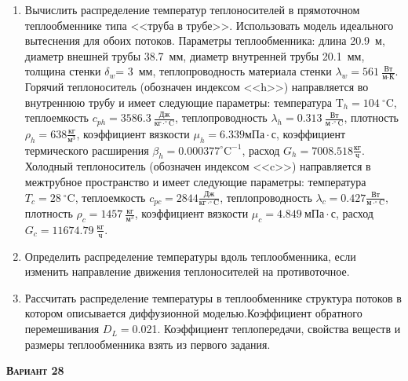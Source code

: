 \begin{enumerate} 
\item Вычислить распределение температур теплоносителей в прямоточном теплообменнике типа <<труба в трубе>>. Использовать модель идеального вытеснения для обоих потоков. Параметры теплообменника: длина  20.9~м, диаметр внешней трубы 38.7~мм,  диаметр внутренней трубы 20.1~мм, толщина стенки $\delta_{w}$=     3~мм,  теплопроводность материала стенки $\lambda_{w}=  561~\frac{\text{Вт}}{\text{м} \cdot \text{К}}$.  Горячий теплоноситель (обозначен индексом <<h>>) направляется во внутреннюю трубу и	 имеет следующие параметры: температура $\text{T}_{h}= 104~^\circ\mathrm{C}$, теплоемкость	  $c_{p{h}}= 3586.3~\frac{\text{Дж}}{\text{кг} \cdot ^\circ\mathrm{C}}$, теплопроводность 		$\lambda_{h}= 0.313~\frac{\text{Вт}}{\text{м} \cdot ^\circ\mathrm{C}}$, плотность 		$\rho_{h}=  638 \frac{\text{кг}}{\text{м}^3}$, коэффициент вязкости $\mu_{h}=6.339 \text{мПа} 		\cdot \text{с} $, коэффициент термического расширения $\beta_{h}=0.000377 ^\circ\mathrm{C}^{-1}$,		 расход $G_{h}= 7008.518 \frac{\text{кг}}{\text{ч}}$. Холодный теплоноситель (обозначен индексом <<c>>) 		 направляется в межтрубное пространство и имеет следующие параметры: температура $T_{c}=   28		 ~^\circ\mathrm{C}$, теплоемкость $c_{p{c}}= 2844 \frac{\text{Дж}}{\text{кг} \cdot ^\circ\mathrm{C}}$,			 теплопроводность $\lambda_{c}=0.427 \frac{\text{Вт}}{\text{м} \cdot ^\circ\mathrm{C}}$, плотность 			 $\rho_{c}=  1457~\frac{\text{кг}}{\text{м}^3}$, коэффициент вязкости $\mu_{c}=4.849~\text{мПа} \cdot \text{с} $, 			 расход $G_{c}=11674.79~\frac{\text{кг}}{\text{ч}}$. 

\item Определить распределение температуры вдоль теплообменника, если 	изменить направление движения теплоносителей на противоточное.

\item Рассчитать распределение температуры в теплообменнике структура потоков в котором описывается диффузионной моделью.Коэффициент обратного перемешивания $D_L = $0.021. Коэффициент теплопередачи, свойства веществ и размеры теплообменника взять из первого задания. 

\end{enumerate}

\textsc{\textbf{Вариант 28}}

